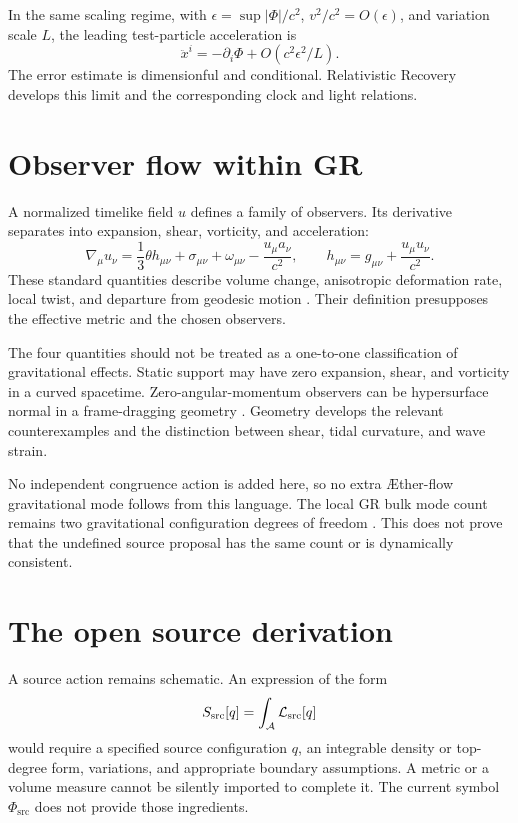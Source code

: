 \documentclass[11pt,oneside]{report}
\newcommand{\Aflow}{\AE{}ther-flow}
\newcommand{\Sub}{\mathcal A}
\newcommand{\PhiSrc}{\Phi_{\mathrm{src}}}
\newcommand{\Ph}{\Phi}
\theoremstyle{remark}
\numberwithin{definition}{chapter}
\numberwithin{proposition}{chapter}
\numberwithin{remark}{chapter}
\begin{document}
In the same scaling regime, with $\epsilon=\sup|\Ph|/c^2$, $v^2/c^2=O(\epsilon)$, and variation scale $L$, the leading test-particle acceleration is
\begin{equation}
\ddot x^i=-\partial_i\Ph+O(c^2\epsilon^2/L).
\end{equation}
The error estimate is dimensionful and conditional. Relativistic Recovery develops this limit and the corresponding clock and light relations.

\section{Observer flow within GR}
A normalized timelike field $u$ defines a family of observers. Its derivative separates into expansion, shear, vorticity, and acceleration:
\begin{equation}
\nabla_\mu u_\nu=\frac13\theta h_{\mu\nu}+\sigma_{\mu\nu}
+\omega_{\mu\nu}-\frac{u_\mu a_\nu}{c^2},\qquad
h_{\mu\nu}=g_{\mu\nu}+\frac{u_\mu u_\nu}{c^2}.
\end{equation}
These standard quantities describe volume change, anisotropic deformation rate, local twist, and departure from geodesic motion \parencite{EllisVanElst1999}. Their definition presupposes the effective metric and the chosen observers.

The four quantities should not be treated as a one-to-one classification of gravitational effects. Static support may have zero expansion, shear, and vorticity in a curved spacetime. Zero-angular-momentum observers can be hypersurface normal in a frame-dragging geometry \parencite{Gourgoulhon2010}. Geometry develops the relevant counterexamples and the distinction between shear, tidal curvature, and wave strain.

No independent congruence action is added here, so no extra \Aflow{} gravitational mode follows from this language. The local GR bulk mode count remains two gravitational configuration degrees of freedom \parencite{ADM1962}. This does not prove that the undefined source proposal has the same count or is dynamically consistent.

\section{The open source derivation}
A source action remains schematic. An expression of the form
\begin{equation}
S_{\rm src}[q]=\int_{\Sub}\mathcal L_{\rm src}[q]
\label{exact_closure_note:eq:substrateaction}
\end{equation}
would require a specified source configuration $q$, an integrable density or top-degree form, variations, and appropriate boundary assumptions. A metric or a volume measure cannot be silently imported to complete it. The current symbol $\PhiSrc$ does not provide those ingredients.
\end{document}
